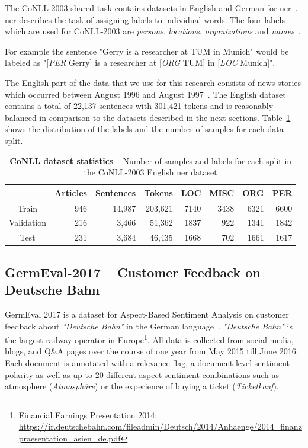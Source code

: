The CoNLL-2003 shared task contains datasets in English and German for \acrfull{ner}~\cite{Erik2003}. \gls{ner} describes the task of assigning labels to individual words. The four labels which are used for CoNLL-2003 are \textit{persons}, \textit{locations}, \textit{organizations} and \textit{names}~\cite{Erik2003}. 

For example the sentence "Gerry is a researcher at TUM in Munich" would be labeled as "[\textit{PER} Gerry] is a researcher at [\textit{ORG} TUM] in [\textit{LOC} Munich]".
\medskip

The English part of the data that we use for this research consists of news stories which occurred between August 1996 and August 1997~\cite{Erik2003}. The English dataset contains a total of 22,137 sentences with 301,421 tokens and is reasonably balanced in comparison to the datasets described in the next sections. Table~\ref{tab:05_conll2003DatasetStats} shows the distribution of the labels and the number of samples for each data split.

\begin{table}
    \centering
    \begin{tabular}{crrrrrrr}
        \toprule
        & Articles & Sentences & Tokens & LOC & MISC & ORG & PER \\ 
        \midrule
        Train & 946 & 14,987 & 203,621 & 7140 & 3438 & 6321 & 6600 \\ 
        Validation & 216 & 3,466 & 51,362 & 1837 & 922 & 1341 & 1842 \\ 
        Test & 231 & 3,684 & 46,435 & 1668 & 702 & 1661 & 1617 \\ 
        \bottomrule 
    \end{tabular} 
\caption{\textbf{CoNLL dataset statistics} -- Number of samples and labels for each split in the CoNLL-2003 English \gls{ner} dataset}
\label{tab:05_conll2003DatasetStats}
\end{table}


\subsection{GermEval-2017 -- Customer Feedback on Deutsche Bahn}
\label{sec:05_germeval}
GermEval 2017 is a dataset for Aspect-Based Sentiment Analysis on customer feedback about \textit{"Deutsche Bahn"} in the German language~\cite{Wojatzki2017}. \textit{"Deutsche Bahn"} is the largest railway operator in Europe\footnote{Financial Earnings Presentation 2014: \url{https://ir.deutschebahn.com/fileadmin/Deutsch/2014/Anhaenge/2014_finanzpraesentation_asien_de.pdf}}. All data is collected from social media, blogs, and Q\&A pages over the course of one year from May 2015 till June 2016. Each document is annotated with a relevance flag, a document-level sentiment polarity as well as up to 20 different aspect-sentiment combinations such as atmosphere {(\textit{Atmosphäre})} or the experience of buying a ticket {(\textit{Ticketkauf})}.
\medskip

